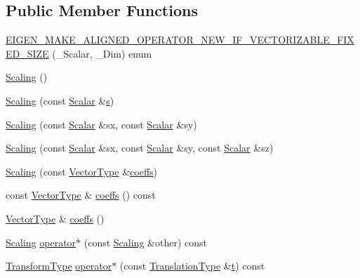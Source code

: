 \subsection*{Public Member Functions}
\begin{DoxyCompactItemize}
\item 
\hyperlink{class_scaling_a46ef6fa50943bbdd935b4e2fbfff4957}{E\-I\-G\-E\-N\-\_\-\-M\-A\-K\-E\-\_\-\-A\-L\-I\-G\-N\-E\-D\-\_\-\-O\-P\-E\-R\-A\-T\-O\-R\-\_\-\-N\-E\-W\-\_\-\-I\-F\-\_\-\-V\-E\-C\-T\-O\-R\-I\-Z\-A\-B\-L\-E\-\_\-\-F\-I\-X\-E\-D\-\_\-\-S\-I\-Z\-E} (\-\_\-\-Scalar, \-\_\-\-Dim) enum
\item 
\hyperlink{class_scaling_a51666e1966019a37ed09676d5718f744}{Scaling} ()
\item 
\hyperlink{class_scaling_acb4a02abfdc541a735c458004e77ccba}{Scaling} (const \hyperlink{class_scaling_a3e27d3992328c2ebeb624ddc129659d1}{Scalar} \&\hyperlink{glext_8h_ad585a1393cfa368fa9dc3d8ebff640d5}{s})
\item 
\hyperlink{class_scaling_af25a0d885827aa684311e8a5a617fb96}{Scaling} (const \hyperlink{class_scaling_a3e27d3992328c2ebeb624ddc129659d1}{Scalar} \&sx, const \hyperlink{class_scaling_a3e27d3992328c2ebeb624ddc129659d1}{Scalar} \&sy)
\item 
\hyperlink{class_scaling_ae53d0c8ad9db7ccc094c8c62d1481968}{Scaling} (const \hyperlink{class_scaling_a3e27d3992328c2ebeb624ddc129659d1}{Scalar} \&sx, const \hyperlink{class_scaling_a3e27d3992328c2ebeb624ddc129659d1}{Scalar} \&sy, const \hyperlink{class_scaling_a3e27d3992328c2ebeb624ddc129659d1}{Scalar} \&sz)
\item 
\hyperlink{class_scaling_af64e491a1bb16d25c6ca27f6c5fed08a}{Scaling} (const \hyperlink{class_scaling_a48ec70d6974c8d2c90ad7ca7a5c16f97}{Vector\-Type} \&\hyperlink{class_scaling_a80c09c870df89bd6aeefca8061535e66}{coeffs})
\item 
const \hyperlink{class_scaling_a48ec70d6974c8d2c90ad7ca7a5c16f97}{Vector\-Type} \& \hyperlink{class_scaling_a80c09c870df89bd6aeefca8061535e66}{coeffs} () const 
\item 
\hyperlink{class_scaling_a48ec70d6974c8d2c90ad7ca7a5c16f97}{Vector\-Type} \& \hyperlink{class_scaling_a08656028a9da0498b2f0829d12438c1f}{coeffs} ()
\item 
\hyperlink{class_scaling}{Scaling} \hyperlink{class_scaling_a862d40d8eb09b4bd89ce5cdf5710c014}{operator$\ast$} (const \hyperlink{class_scaling}{Scaling} \&other) const 
\item 
\hyperlink{class_scaling_acee313a178d65c86e0de34b9b9cc4f7f}{Transform\-Type} \hyperlink{class_scaling_a4bd040c3a34fe5abd51f3b3a61e759f1}{operator$\ast$} (const \hyperlink{class_scaling_ad5f1911d0d47a289f53407e56465b5c5}{Translation\-Type} \&\hyperlink{glext_8h_a00140d6f5c548b26daf170bf16e86a6d}{t}) const 

\end{DoxyCompactItemize}
